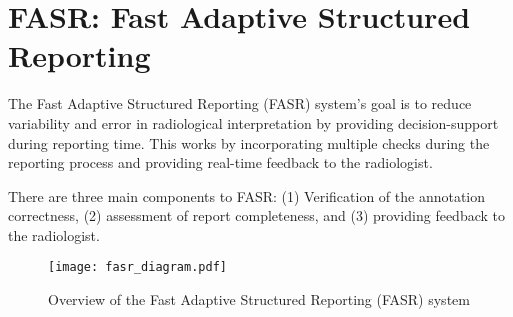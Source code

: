 \section{FASR: Fast Adaptive Structured Reporting}
The Fast Adaptive Structured Reporting (FASR) system's goal is to reduce variability and error in radiological interpretation by providing decision-support during reporting time. This works by incorporating multiple checks during the reporting process and providing real-time feedback to the radiologist.

There are three main components to FASR: (1) Verification of the annotation correctness, (2) assessment of report completeness, and (3) providing feedback to the radiologist.

\begin{figure}[h]
	\centering
	\texttt{[image: fasr\_diagram.pdf]}
	\caption{Overview of the Fast Adaptive Structured Reporting (FASR) system}
	\label{fig:fasr_diagram}
\end{figure}
